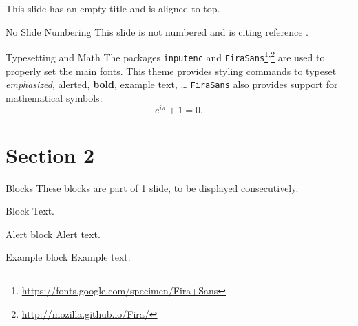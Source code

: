 \documentclass{beamer}
\begin{document}
\begin{frame}[t]
	This slide has an empty title and is aligned to top.
\end{frame}


\begin{frame}[noframenumbering]{No Slide Numbering}
	This slide is not numbered and is citing reference \cite{knuth74}.
\end{frame}


\begin{frame}{Typesetting and Math}
	The packages \texttt{inputenc} and \texttt{FiraSans}\footnote{\url{https://fonts.google.com/specimen/Fira+Sans}}\textsuperscript{,}\footnote{\url{http://mozilla.github.io/Fira/}} are used to properly set the main fonts.
	\vfill
	This theme provides styling commands to typeset \emph{emphasized}, \alert{alerted}, \textbf{bold}, \textcolor{example}{example text}, \dots
	\vfill
	\texttt{FiraSans} also provides support for mathematical symbols:
	\begin{equation*}
		e^{i\pi} + 1 = 0.
	\end{equation*}
\end{frame}


\section{Section 2}


\begin{frame}{Blocks}
	These blocks are part of 1 slide, to be displayed consecutively.
	\begin{block}{Block}
		Text.
	\end{block}
	\pause %
	\begin{alertblock}{Alert block}
		Alert \alert{text}.
	\end{alertblock}
	\pause %
	\begin{exampleblock}{Example block}
		Example \textcolor{example}{text}.
	\end{exampleblock}
\end{frame}
\end{document}
